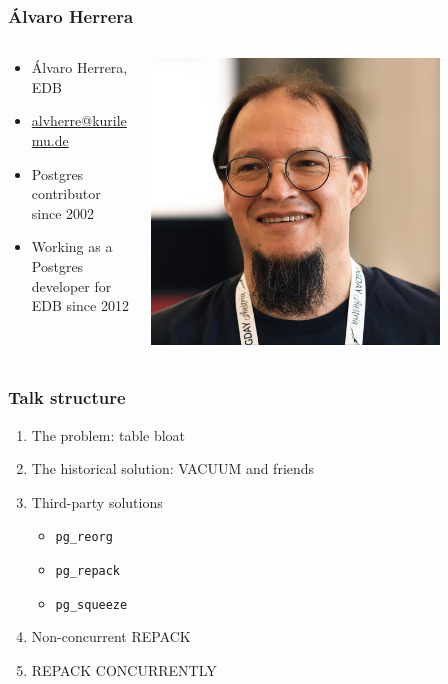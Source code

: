 \begin{frame}
  \frametitle{Álvaro Herrera}

  \begin{columns}[T]
    \begin{column}{0.8\textwidth}
      \begin{itemize}
	\item Álvaro Herrera, EDB
	\item \href{mailto:alvherre@kurilemu.de}{alvherre@kurilemu.de}
	\item Postgres contributor since 2002
	\item Working as a Postgres developer for EDB since 2012
      \end{itemize}
    \end{column}
    \begin{column}{0.2\textwidth}
      \includegraphics[width=0.8\textwidth]{alvaro-faceshot.jpg}
    \end{column}
  \end{columns}
\end{frame}

\begin{frame}
  \frametitle{Talk structure}
  \begin{enumerate}
    \item The problem: table bloat
    \item The historical solution: VACUUM and friends
    \item Third-party solutions
      \begin{itemize}
	\item \texttt{pg\_reorg}
	\item \texttt{pg\_repack}
	\item \texttt{pg\_squeeze}
      \end{itemize}
    \item Non-concurrent REPACK
    \item REPACK CONCURRENTLY
  \end{enumerate}
\end{frame}


